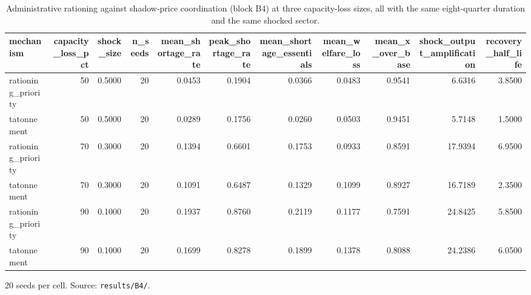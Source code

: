 \begin{table}[htbp]
\centering
\caption{Administrative rationing against shadow-price coordination (block B4) at three capacity-loss sizes, all with the same eight-quarter duration and the same shocked sector.}
\label{tab:rationing_shadow}
\begin{tabular}{lrrrrrrrrrr}
\toprule
mechanism & capacity\_loss\_pct & shock\_size & n\_seeds & mean\_shortage\_rate & peak\_shortage\_rate & mean\_shortage\_essentials & mean\_welfare\_loss & mean\_x\_over\_base & shock\_output\_amplification & recovery\_half\_life \\
\midrule
rationing\_priority & 50 & 0.5000 & 20 & 0.0453 & 0.1904 & 0.0366 & 0.0483 & 0.9541 & 6.6316 & 3.8500 \\
tatonnement & 50 & 0.5000 & 20 & 0.0289 & 0.1756 & 0.0260 & 0.0503 & 0.9451 & 5.7148 & 1.5000 \\
rationing\_priority & 70 & 0.3000 & 20 & 0.1394 & 0.6601 & 0.1753 & 0.0933 & 0.8591 & 17.9394 & 6.9500 \\
tatonnement & 70 & 0.3000 & 20 & 0.1091 & 0.6487 & 0.1329 & 0.1099 & 0.8927 & 16.7189 & 2.3500 \\
rationing\_priority & 90 & 0.1000 & 20 & 0.1937 & 0.8760 & 0.2119 & 0.1177 & 0.7591 & 24.8425 & 5.8500 \\
tatonnement & 90 & 0.1000 & 20 & 0.1699 & 0.8278 & 0.1899 & 0.1378 & 0.8088 & 24.2386 & 6.0500 \\
\bottomrule
\end{tabular}
\par\smallskip
\begin{minipage}{\linewidth}\footnotesize 20 seeds per cell. Source: \texttt{results/B4/}.\end{minipage}
\end{table}
